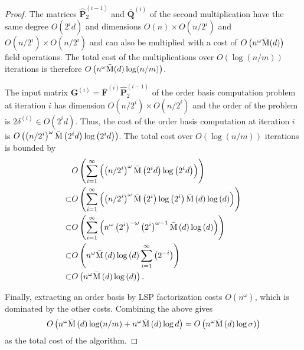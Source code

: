 \begin{proof}
The matrices $\hat{\mathbf{P}}_{2}^{\left(i-1\right)}$ and $\bar{\mathbf{Q}}^{\left(i\right)}$
of the second multiplication have the same degree $O(2^{i}d)$ and
dimensions $O\left(n\right)\times O(n/2^{i})$ and $O(n/2^{i})\times O(n/2^{i})$
and can also be multiplied with a cost of $O\left(n^{\omega}\bar{\M}(d)\right)$
field operations. The total cost of the multiplications over $O(\log\left(n/m\right))$
iterations is therefore $O\left(n^{\omega}\bar{\M}(d)\log(n/m)\right)$.

The input matrix $\mathbf{G}^{\left(i\right)}=\bar{\mathbf{F}}^{\left(i\right)}\hat{\mathbf{P}}_{2}^{\left(i-1\right)}$
of the order basis computation problem at iteration $i$ has dimension
$O(n/2^{i})\times O(n/2^{i})$ and the order of the problem is $2\delta^{\left(i\right)}\in O(2^{i}d)$.
Thus, the cost of the order basis computation at iteration $i$ is
$O\left(\left(n/2^{i}\right)^{\omega}\bar{\M}\left(2^{i}d\right)\log\left(2^{i}d\right)\right)$.
The total cost over $O(\log\left(n/m\right))$ iterations is bounded
by 
\begin{align*}
 & O\left(\sum_{i=1}^{\infty}\left(\left(n/2^{i}\right)^{\omega}\bar{\M}\left(2^{i}d\right)\log\left(2^{i}d\right)\right)\right)\\
\subset & O\left(\sum_{i=1}^{\infty}\left(\left(n/2^{i}\right)^{\omega}\bar{\M}\left(2^{i}\right)\log\left(2^{i}\right)\bar{\M}\left(d\right)\log\left(d\right)\right)\right)\\
\subset & O\left(\sum_{i=1}^{\infty}\left(n^{\omega}\left(2^{i}\right)^{-\omega}\left(2^{i}\right)^{\omega-1}\bar{\M}\left(d\right)\log\left(d\right)\right)\right)\\
\subset & O\left(n^{\omega}\bar{\M}\left(d\right)\log\left(d\right)\sum_{i=1}^{\infty}\left(2^{-i}\right)\right)\\
\subset & O\left(n^{\omega}\bar{\M}\left(d\right)\log\left(d\right)\right).
\end{align*}


Finally, extracting an order basis by LSP factorization costs $O\left(n^{\omega}\right)$,
which is dominated by the other costs. Combining the above gives 
\[
O\left(n^{\omega}\bar{\M}\left(d\right)\log(n/m)+n^{\omega}\bar{\M}\left(d\right)\log d\right)=O\left(n^{\omega}\bar{\M}\left(d\right)\log\sigma)\right)
\]
 as the total cost of the algorithm. \end{proof}

